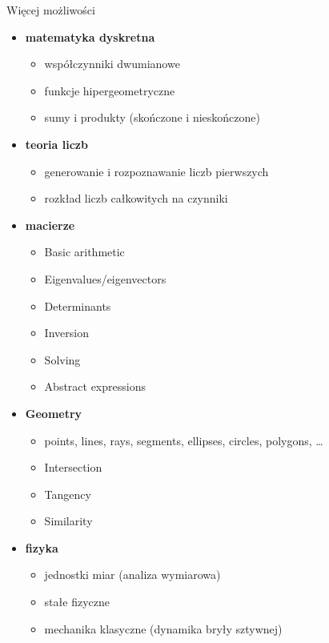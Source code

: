 \documentclass[10pt]{beamer}
\begin{document}
\begin{frame}{Więcej możliwości}
  \begin{multicols}{2}
    \begin{itemize}
      \tiny
      \item \textbf{matematyka dyskretna}
        \begin{itemize}
          \tiny
          \item współczynniki dwumianowe
          \item funkcje hipergeometryczne
          \item sumy i produkty (skończone i nieskończone)
      \end{itemize}
      \item \textbf{teoria liczb}
        \begin{itemize}
          \tiny
          \item generowanie i rozpoznawanie liczb pierwszych
          \item rozkład liczb całkowitych na czynniki
        \end{itemize}
      \item \textbf{macierze}
        \begin{itemize}
          \tiny
          \item Basic arithmetic
          \item Eigenvalues/eigenvectors
          \item Determinants
          \item Inversion
          \item Solving
          \item Abstract expressions
        \end{itemize}
      \item \textbf{Geometry}
        \begin{itemize}
          \tiny
          \item points, lines, rays, segments, ellipses, circles, polygons, \ldots
          \item Intersection
          \item Tangency
          \item Similarity
        \end{itemize}
      \item \textbf{fizyka}
        \begin{itemize}
          \tiny
          \item jednostki miar (analiza wymiarowa)
          \item stałe fizyczne
          \item mechanika klasyczne (dynamika bryły sztywnej)

\end{itemize}
\end{itemize}
\end{multicols}
\end{frame}
\end{document}
